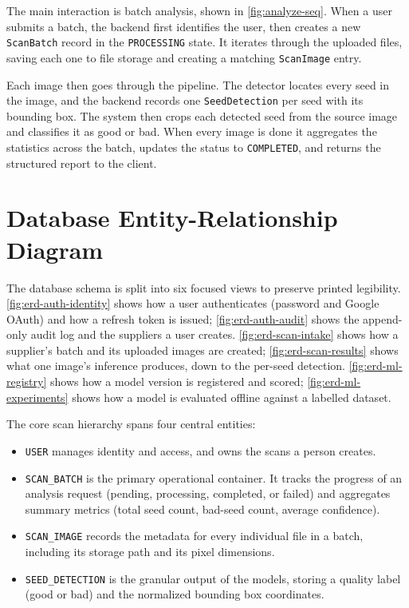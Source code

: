 The main interaction is batch analysis, shown in \autoref{fig:analyze-seq}. When
a user submits a batch, the backend first identifies the user, then creates a new
\texttt{ScanBatch} record in the \texttt{PROCESSING} state. It iterates through
the uploaded files, saving each one to file storage and creating a matching
\texttt{ScanImage} entry.

Each image then goes through the pipeline. The detector locates every seed in the
image, and the backend records one \texttt{SeedDetection} per seed with its
bounding box. The system then crops each detected seed from the source image and
classifies it as good or bad. When every image is done it aggregates the
statistics across the batch, updates the status to \texttt{COMPLETED}, and returns
the structured report to the client.


\section{Database Entity-Relationship Diagram}

The database schema is split into six focused views to preserve printed
legibility. \autoref{fig:erd-auth-identity} shows how a user authenticates
(password and Google OAuth) and how a refresh token is issued;
\autoref{fig:erd-auth-audit} shows the append-only audit log and the
suppliers a user creates. \autoref{fig:erd-scan-intake} shows how a
supplier's batch and its uploaded images are created; \autoref{fig:erd-scan-results}
shows what one image's inference produces, down to the per-seed detection.
\autoref{fig:erd-ml-registry} shows how a model version is registered and
scored; \autoref{fig:erd-ml-experiments} shows how a model is evaluated
offline against a labelled dataset.

\begin{minipage}{\linewidth}
The core scan hierarchy spans four central entities:
\begin{itemize}
    \item \texttt{USER} manages identity and access, and owns the scans a person creates.
    \item \texttt{SCAN\_BATCH} is the primary operational container. It tracks the progress of an analysis request (pending, processing, completed, or failed) and aggregates summary metrics (total seed count, bad-seed count, average confidence).
    \item \texttt{SCAN\_IMAGE} records the metadata for every individual file in a batch, including its storage path and its pixel dimensions.
    \item \texttt{SEED\_DETECTION} is the granular output of the models, storing a quality label (good or bad) and the normalized bounding box coordinates.
\end{itemize}
\end{minipage}

